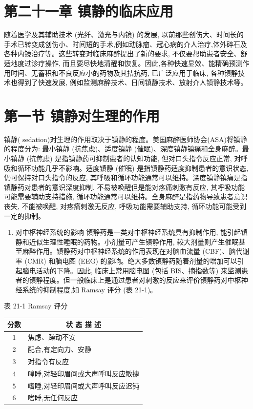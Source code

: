 \documentclass[10pt]{article}
\begin{document}
\section*{第二十一章 镇静的临床应用}
随着医学及其辅助技术 (光纤、激光与内镜) 的发展, 以前那些创伤大、时间长的手术已转变成创伤小、时间短的手术,例如动脉瘤、冠心病的介人治疗,体外碎石及各种内镜治疗等。这些转变对临床麻醉提出了新的要求, 不仅要帮助患者安全、舒适地度过诊疗操作, 而且要尽快地清醒和恢复。因此,各种快速显效、能精确预测作用时间、无蓄积和不良反应小的药物及其拮抗药, 已广泛应用于临床, 各种镇静技术也得到了快速发展, 例如监测麻醉技术、日间镇静技术、放射介人镇静技术等。

\section*{第一节 镇静对生理的作用}
镇静( sedation)对生理的作用取决于镇静的程度。美国麻醉医师协会(ASA)将镇静的程度分为: 最小镇静 (抗焦虑)、适度镇静 (催眠)、深度镇静镇痛和全身麻醉。最小镇静 (抗焦虑) 是指镇静药可抑制患者的认知功能, 但对口头指令反应正常, 对呼吸和循环功能几乎不影响。适度镇静 (催眠) 是指镇静药适度抑制患者的意识状态, 仍可保持对口头指令的反应, 其呼吸和循环功能通常可以维持。深度镇静镇痛是指镇静药对患者的意识深度抑制, 不易被唤醒但是能对疼痛刺激有反应, 其呼吸功能可能需要辅助支持措施, 循环功能通常可以维持。全身麻醉是指药物导致患者意识丧失, 不能被唤醒, 对疼痛刺激无反应, 呼吸功能需要辅助支持, 循环功能可能受到一定的抑制。

\begin{enumerate}
  \item 对中枢神经系统的影响 镇静药是一类对中枢神经系统具有抑制作用, 能引起镇静和近似生理性睡眠的药物。小剂量可产生镇静作用, 较大剂量则产生催眠甚至麻醉作用。镇静药对中枢神经系统的作用表现在对脑血流量 (CBF)、脑代谢率 (CMR) 和脑电图 (EEG) 的影响。绝大多数镇静药随着剂量的增加可以引起脑电活动的下降。因此, 临床上常用脑电图 (包括 BIS、摘指数等) 来监测患者的镇静程度。但一般临床上是通过患者对刺激的反应来评价镇静药对中枢神经系统的抑制程度,如 Ramsay 评分 (表 21-1)。
\end{enumerate}

表 21-1 Ramsay 评分

\begin{center}
\begin{tabular}{cl}
\hline
分数 & \multicolumn{1}{c}{状 态 描 述} \\
\hline
1 & 焦虑、躁动不安 \\
2 & 配合,有定向力、安静 \\
3 & 对指令有反应 \\
4 & 喤睡,对轻印眉间或大声呼叫反应敏捷 \\
5 & 嗜睡,对轻印眉间或大声呼叫反应迟钝 \\
6 & 嗜睡,无任何反应 \\
\hline
\end{tabular}
\end{center}
\end{document}
